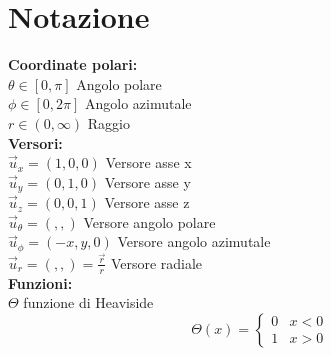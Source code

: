\chapter{Notazione}
%
\textbf{Coordinate polari:}\\
 $\theta \in[0,\pi]$ Angolo polare\\
 $\phi \in [0,2\pi]$ Angolo azimutale\\
 $r \in (0,\infty)$ Raggio\\

\textbf{Versori:}\\
$\vec u_x = (1,0,0)$ Versore asse x \\
$\vec u_y = (0,1,0)$ Versore asse y \\
$\vec u_z = (0,0,1)$ Versore asse z \\

$\vec u _\theta = (,,)$ Versore angolo polare \\
$\vec u _\phi = (-x,y,0)$ Versore angolo azimutale \\
$\vec u _r = (,,) = \frac{\vec r}{r}$ Versore radiale \\


\textbf{Funzioni:}\\
$\Theta$ funzione di Heaviside
$$
    \Theta(x) = \begin{cases}
       0 & x < 0\\
       1 & x > 0
    \end{cases}
$$
